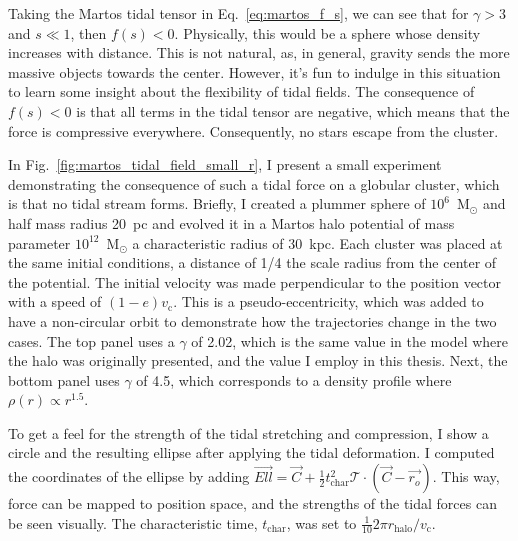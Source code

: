             Taking the Martos tidal tensor in Eq.~\ref{eq:martos_f_s}, we can see that for $\gamma > 3$ and $s \ll  1$, then $f(s)< 0$. Physically, this would be a sphere whose density increases with distance. This is not natural, as, in general, gravity sends the more massive objects towards the center. However, it's fun to indulge in this situation to learn some insight about the flexibility of tidal fields. The consequence of $f(s)< 0$ is that all terms in the tidal tensor are negative, which means that the force is compressive everywhere. Consequently, no stars escape from the cluster. 

            In Fig.~\ref{fig:martos_tidal_field_small_r}, I present a small experiment demonstrating the consequence of such a tidal force on a globular cluster, which is that no tidal stream forms. Briefly, I created a plummer sphere of $10^6$~M$_\odot$ and half mass radius 20~pc and evolved it in a Martos halo potential of mass parameter $10^{12}$~M$_\odot$ a characteristic radius of $30$~kpc. Each cluster was placed at the same initial conditions, a distance of 1/4 the scale radius from the center of the potential. The initial velocity was made perpendicular to the position vector with a speed of $(1-e)v_\textrm{c}$. This is a pseudo-eccentricity, which was added to have a non-circular orbit to demonstrate how the trajectories change in the two cases. The top panel uses a $\gamma$ of 2.02, which is the same value in the model where the halo was originally presented, and the value I employ in this thesis. Next, the bottom panel uses $\gamma$ of 4.5, which corresponds to a density profile where $\rho(r) \propto r^{1.5}$. 

            To get a feel for the strength of the tidal stretching and compression, I show a circle and the resulting ellipse after applying the tidal deformation. I computed the coordinates of the ellipse by adding $\vec{Ell} = \vec{C} + \frac{1}{2} t_\textrm{char}^2 \mathcal{T}\cdot \left(\vec{C} - \vec{r_o}\right)$. This way, force can be mapped to position space, and the strengths of the tidal forces can be seen visually. The characteristic time, $t_\textrm{char}$, was set to $\frac{1}{10} 2\pi r_\textrm{halo} / v_\textrm{c}$. 
            
